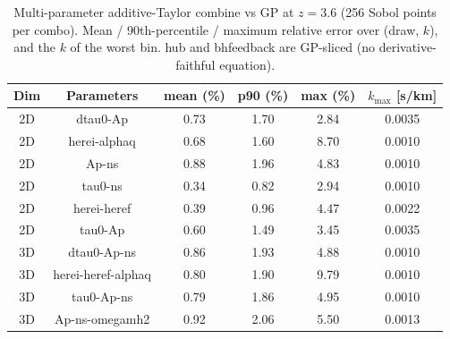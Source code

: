 \begin{table}[!h]
\caption{\label{tab:multid} Multi-parameter additive-Taylor combine vs GP at $z=3.6$ (256 Sobol points per combo). Mean / 90th-percentile / maximum relative error over (draw, $k$), and the $k$ of the worst bin. hub and bhfeedback are GP-sliced (no derivative-faithful equation).}
\begin{ruledtabular}\centering
\begin{tabular}{c|c|cccc}
Dim & Parameters & mean (\%) & p90 (\%) & max (\%) & $k_{\max}$ [s/km] \\
\hline
2D & dtau0-Ap & 0.73 & 1.70 & 2.84 & 0.0035 \\
2D & herei-alphaq & 0.68 & 1.60 & 8.70 & 0.0010 \\
2D & Ap-ns & 0.88 & 1.96 & 4.83 & 0.0010 \\
2D & tau0-ns & 0.34 & 0.82 & 2.94 & 0.0010 \\
2D & herei-heref & 0.39 & 0.96 & 4.47 & 0.0022 \\
2D & tau0-Ap & 0.60 & 1.49 & 3.45 & 0.0035 \\
3D & dtau0-Ap-ns & 0.86 & 1.93 & 4.88 & 0.0010 \\
3D & herei-heref-alphaq & 0.80 & 1.90 & 9.79 & 0.0010 \\
3D & tau0-Ap-ns & 0.79 & 1.86 & 4.95 & 0.0010 \\
3D & Ap-ns-omegamh2 & 0.92 & 2.06 & 5.50 & 0.0013 \\
\end{tabular}\end{ruledtabular}\end{table}
